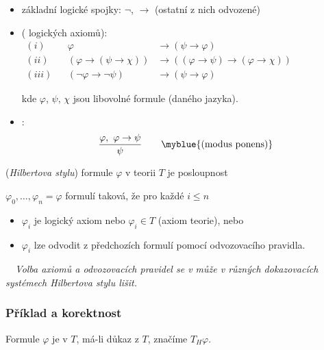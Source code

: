 
\begin{itemize}
    \item základní logické spojky: $\neg$, $\to$ (ostatní z nich odvozené)
    
    \item {} ( logických axiomů):
    \vspace{-2mm}\begin{align*}(i)& &\varphi &\to (\psi \to \varphi) \\
    (ii)& &(\varphi\to (\psi \to \chi))&\to ((\varphi \to \psi)\to(\varphi \to \chi))\qquad\qquad\qquad\qquad\phantom{\ } \\
    (iii)& &(\neg \varphi \to \neg \psi)&\to(\psi \to \varphi)
    \end{align*}
    
    \vspace{-2mm}
    kde $\varphi$, $\psi$, $\chi$ jsou libovolné formule (daného jazyka).
    \item {}:
    \vspace{-3mm}
    $$\frac{\varphi,\ \varphi \to \psi}{\psi}\qquad\text{\myblue{(modus ponens)}}$$
    \end{itemize}
    
    \vspace{-1mm}
     (\emph{Hilbertova stylu}) formule $\varphi$ v teorii $T$ je  posloupnost
    \smallskip
    
    $\varphi_0, \dots, \varphi_n=\varphi$ formulí taková, že pro každé $i\le n$
    \begin{itemize}
    \item $\varphi_i$ je logický axiom nebo $\varphi_i \in T$ (axiom teorie), nebo
    \item $\varphi_i$ lze odvodit z předchozích formulí pomocí odvozovacího pravidla.
    \end{itemize}
    
    \medskip
    
    {\it {}\ \ Volba axiomů a odvozovacích pravidel se v může v různých dokazovacích systémech Hilbertova stylu lišit.}
    
    \subsubsection*{Příklad a korektnost}
    Formule $\varphi$ je  v $T$, má-li důkaz z $T$, značíme $T _{H} \varphi$.
    \smallskip
    
